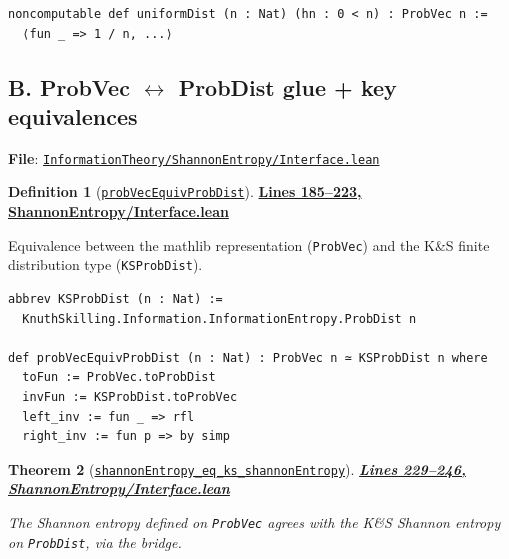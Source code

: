 \documentclass[11pt]{article}
\newtheorem{theorem}{Theorem}[section]
\theoremstyle{definition}
\newtheorem{definition}[theorem]{Definition}
\theoremstyle{remark}
\begin{document}
\begin{lstlisting}[caption={Uniform distribution on Fin n}]
noncomputable def uniformDist (n : Nat) (hn : 0 < n) : ProbVec n :=
  ⟨fun _ => 1 / n, ...⟩
\end{lstlisting}

\subsection*{B. ProbVec $\leftrightarrow$ ProbDist glue + key equivalences}

\textbf{File}: \href{https://github.com/zariuq/ks-foundations-of-inference/blob/main/InformationTheory/ShannonEntropy/Interface.lean}{\texttt{InformationTheory/ShannonEntropy/Interface.lean}}

\begin{definition}[\href{https://github.com/zariuq/ks-foundations-of-inference/blob/main/InformationTheory/ShannonEntropy/Interface.lean\#L219}{\texttt{probVecEquivProbDist}}]
\textbf{\href{https://github.com/zariuq/ks-foundations-of-inference/blob/main/InformationTheory/ShannonEntropy/Interface.lean\#L185-L223}{Lines 185--223, ShannonEntropy/Interface.lean}}

Equivalence between the mathlib representation (\texttt{ProbVec}) and the K\&S finite distribution
type (\texttt{KSProbDist}).
\end{definition}

\begin{lstlisting}[caption={ProbVec n $\simeq$ KSProbDist n (conversion equivalence)}]
abbrev KSProbDist (n : Nat) :=
  KnuthSkilling.Information.InformationEntropy.ProbDist n

def probVecEquivProbDist (n : Nat) : ProbVec n ≃ KSProbDist n where
  toFun := ProbVec.toProbDist
  invFun := KSProbDist.toProbVec
  left_inv := fun _ => rfl
  right_inv := fun p => by simp
\end{lstlisting}

\begin{theorem}[\href{https://github.com/zariuq/ks-foundations-of-inference/blob/main/InformationTheory/ShannonEntropy/Interface.lean\#L234}{\texttt{shannonEntropy\_eq\_ks\_shannonEntropy}}]
\textbf{\href{https://github.com/zariuq/ks-foundations-of-inference/blob/main/InformationTheory/ShannonEntropy/Interface.lean\#L229-L246}{Lines 229--246, ShannonEntropy/Interface.lean}}

The Shannon entropy defined on \texttt{ProbVec} agrees with the K\&S Shannon entropy on \texttt{ProbDist},
via the bridge.
\end{theorem}
\end{document}
